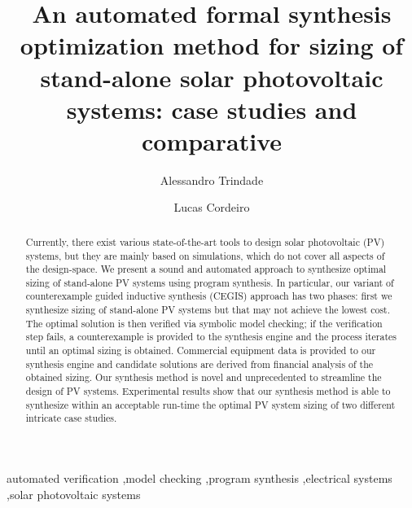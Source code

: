 \documentclass[review]{elsarticle}
\begin{document}
\begin{frontmatter}

\title{An automated formal synthesis optimization method for sizing of stand-alone solar photovoltaic systems: case studies and comparative}
%
%
\author[mymainaddress]{Alessandro Trindade}

\author[mysecondaryaddress]{Lucas Cordeiro}


\address[mymainaddress]{Federal University of Amazonas, Av. Rodrigo Octávio, 6200, Coroado I, 69077-000 Manaus-AM-Brazil}
\address[mysecondaryaddress]{University of Manchester, School of Computer Science, Kilburn Building, Manchester M13 9PL}

\begin{abstract}
Currently, there exist various state-of-the-art tools to design solar photovoltaic (PV) systems, but they are mainly based on simulations, which do not cover all aspects of the design-space. We present a sound and automated approach to synthesize optimal sizing of stand-alone PV systems using program synthesis. In particular, our variant of counterexample guided inductive synthesis (CEGIS) approach has two phases: first we synthesize sizing of stand-alone PV systems but that may not achieve the lowest cost. The optimal solution is then verified via symbolic model checking; if the verification step fails, a counterexample is provided to the synthesis engine and the process iterates until an optimal sizing is obtained. Commercial equipment data is provided to our synthesis engine and candidate solutions are derived from financial analysis of the obtained sizing. Our synthesis method is novel and unprecedented to streamline the design of PV systems. Experimental results show that our synthesis method is able to synthesize within an acceptable run-time the optimal PV system sizing of two different intricate case studies.
\end{abstract}

\begin{keyword}
automated verification \sep model checking \sep program synthesis \sep electrical systems \sep solar photovoltaic systems
\end{keyword}

\end{frontmatter}
\end{document}
